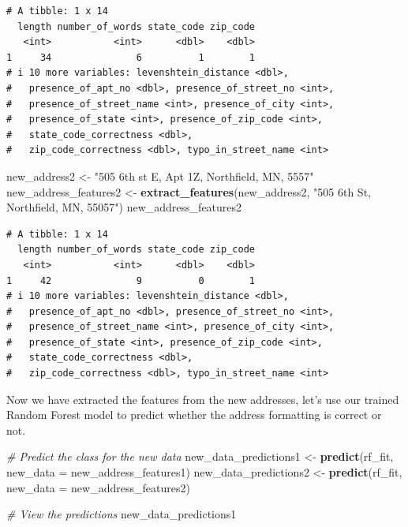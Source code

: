 \documentclass[
]{book}
\newenvironment{Shaded}{\begin{snugshade}}{\end{snugshade}}
\newcommand{\AttributeTok}[1]{\textcolor[rgb]{0.13,0.29,0.53}{#1}}
\newcommand{\CommentTok}[1]{\textcolor[rgb]{0.56,0.35,0.01}{\textit{#1}}}
\newcommand{\FunctionTok}[1]{\textcolor[rgb]{0.13,0.29,0.53}{\textbf{#1}}}
\newcommand{\NormalTok}[1]{#1}
\newcommand{\OtherTok}[1]{\textcolor[rgb]{0.56,0.35,0.01}{#1}}
\newcommand{\StringTok}[1]{\textcolor[rgb]{0.31,0.60,0.02}{#1}}
\begin{document}
\begin{verbatim}
# A tibble: 1 x 14
  length number_of_words state_code zip_code
   <int>           <int>      <dbl>    <dbl>
1     34               6          1        1
# i 10 more variables: levenshtein_distance <dbl>,
#   presence_of_apt_no <dbl>, presence_of_street_no <int>,
#   presence_of_street_name <int>, presence_of_city <int>,
#   presence_of_state <int>, presence_of_zip_code <int>,
#   state_code_correctness <dbl>,
#   zip_code_correctness <dbl>, typo_in_street_name <int>
\end{verbatim}

\begin{Shaded}
\begin{Highlighting}[]
\NormalTok{new\_address2 }\OtherTok{\textless{}{-}} \StringTok{"505 6th st E, Apt 1Z, Northfield, MN, 5557"}
\NormalTok{new\_address\_features2 }\OtherTok{\textless{}{-}} \FunctionTok{extract\_features}\NormalTok{(new\_address2, }\StringTok{"505 6th St,  Northfield, MN, 55057"}\NormalTok{)}
\NormalTok{new\_address\_features2}
\end{Highlighting}
\end{Shaded}

\begin{verbatim}
# A tibble: 1 x 14
  length number_of_words state_code zip_code
   <int>           <int>      <dbl>    <dbl>
1     42               9          0        1
# i 10 more variables: levenshtein_distance <dbl>,
#   presence_of_apt_no <dbl>, presence_of_street_no <int>,
#   presence_of_street_name <int>, presence_of_city <int>,
#   presence_of_state <int>, presence_of_zip_code <int>,
#   state_code_correctness <dbl>,
#   zip_code_correctness <dbl>, typo_in_street_name <int>
\end{verbatim}

Now we have extracted the features from the new addresses, let's use our trained Random Forest model to predict whether the address formatting is correct or not.

\begin{Shaded}
\begin{Highlighting}[]
\CommentTok{\# Predict the class for the new data}
\NormalTok{new\_data\_predictions1 }\OtherTok{\textless{}{-}} \FunctionTok{predict}\NormalTok{(rf\_fit, }\AttributeTok{new\_data =}\NormalTok{ new\_address\_features1)}
\NormalTok{new\_data\_predictions2 }\OtherTok{\textless{}{-}} \FunctionTok{predict}\NormalTok{(rf\_fit, }\AttributeTok{new\_data =}\NormalTok{ new\_address\_features2)}

\CommentTok{\# View the predictions}
\NormalTok{new\_data\_predictions1}
\end{Highlighting}
\end{Shaded}
\end{document}
